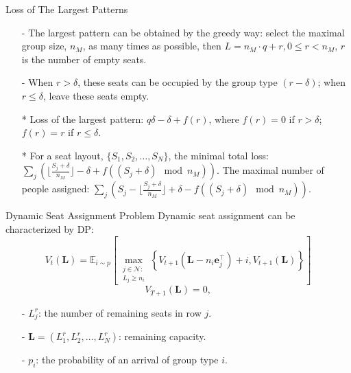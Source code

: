   \begin{frame}{Loss of The Largest Patterns}
    \begin{itemize}
      \item[-] The largest pattern can be obtained by the greedy way: select the maximal group size, $n_{M}$, as many times as possible, then $L = n_{M} \cdot q + r, 0 \leq r < n_{M}$, $r$ is the number of empty seats. 
      \item[-] When $r > \delta$, these seats can be occupied by the group type $(r-\delta)$; when $r \leq \delta$, leave these seats empty.
      \item[*] Loss of the largest pattern: $q \delta -\delta + f(r)$, where $f(r) =0$ if $r > \delta$; $f(r) = r$ if $r \leq \delta$.
      \item[*] For a seat layout, $\{S_1, S_2, \ldots, S_{N}\}$, the minimal total loss: $\sum_{j} (\lfloor \frac{S_j+\delta}{n_{M}} \rfloor -\delta + f((S_j + \delta) \mod n_{M}))$. The maximal number of people assigned: $\sum_{j} (S_j - \lfloor \frac{S_j+\delta}{n_{M}} \rfloor + \delta - f((S_j +\delta)\mod n_{M}))$.
    \end{itemize}
  \end{frame}
  
  \begin{frame}{Dynamic Seat Assignment Problem}
    \centering
    Dynamic seat assignment can be characterized by DP:
    $$V_{t}(\mathbf{L}) = \mathbb{E}_{i \sim p}\left[\max_{\substack{j \in \mathcal{N}: \\ L_j \geqslant {n}_{i}}}\left\{V_{t+1}\left(\mathbf{L}- n_{i}\mathbf{e}_j^{\intercal} \right)+ i, V_{t+1}(\mathbf{L})\right\}\right]$$
    $$V_{T+1}(\mathbf{L}) = 0,$$

    \begin{itemize}
      \item[-] $L^{r}_{j}$: the number of remaining seats in row $j$.
      \item[-] $\mathbf{L} = (L^{r}_1, L^{r}_2, \ldots, L^{r}_{N})$: remaining capacity. 
      \item[-] $p_i$: the probability of an arrival of group type $i$.
    \end{itemize}
\end{frame}